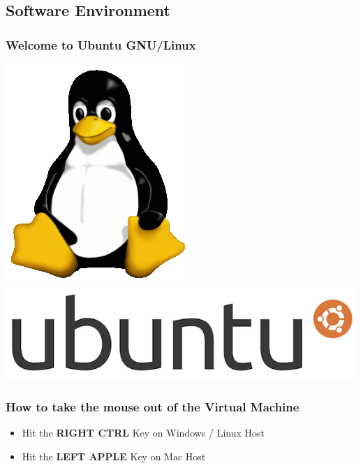 \subsection{Software Environment}


\begin{frame}
\frametitle{Welcome to Ubuntu GNU/Linux}
\begin{center}
\includegraphics[height=0.5\paperheight]{../Art/Tux.png}
\includegraphics[width=0.5\paperwidth]{../Art/blackeubuntulogo.png}
\end{center}
\end{frame}

\begin{frame}
\frametitle{How to take the mouse out of the Virtual Machine}
\begin{itemize}
\item Hit the \textbf{RIGHT CTRL} Key on Windows / Linux Host
\item Hit the \textbf{LEFT APPLE} Key on Mac Host
\end{itemize}
\end{frame}

